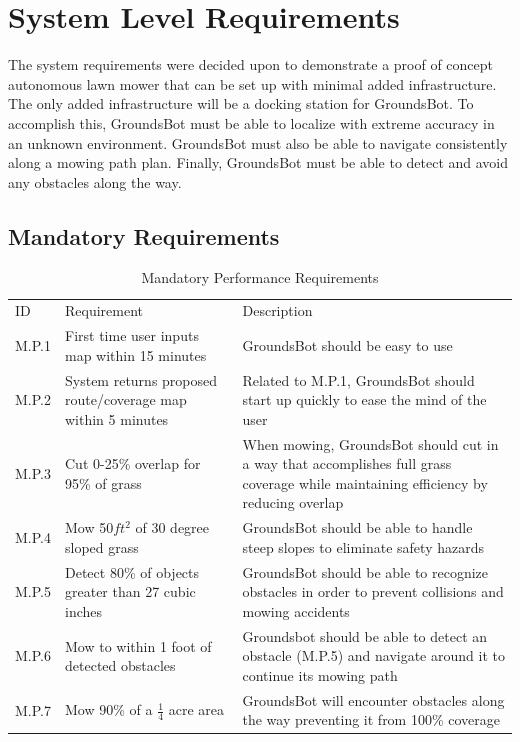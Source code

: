 \documentclass[12pt]{extarticle}
\begin{document}
\newpage
\section{System Level Requirements}

The system requirements were decided upon to demonstrate a proof of concept autonomous lawn mower that can be set up with minimal added infrastructure. The only added infrastructure will be a docking station for GroundsBot. To accomplish this, GroundsBot must be able to localize with extreme accuracy in an unknown environment. GroundsBot must also be able to navigate consistently along a mowing path plan. Finally, GroundsBot must be able to detect and avoid any obstacles along the way.

\subsection{Mandatory Requirements}
\begin{center}
  \begin{table}[H]
  \caption{Mandatory Performance Requirements}
  \label{table:mandatory performance}

  \def\arraystretch{1.5}
  	\begin{tabularx}{\textwidth}{ lXX }
  	  \hline

		\sffamily\normalsize{ID} & \sffamily\normalsize{Requirement} & \sffamily\normalsize{Description} \\
    	M.P.1 &
    	First time user inputs map within 15 minutes &
    	GroundsBot should be easy to use \\
   		M.P.2 &
   		System returns proposed route/coverage map within 5 minutes &
   		Related to M.P.1, GroundsBot should start up quickly to ease the mind of the user \\
   		M.P.3 &
   		Cut 0-25\% overlap for 95\% of grass &
   		When mowing, GroundsBot should cut in a way that accomplishes full grass coverage while maintaining efficiency by reducing overlap\\
		M.P.4 &
		Mow 50$ft^2$ of 30 degree sloped grass &
		GroundsBot should be able to handle steep slopes to eliminate safety hazards \\
		M.P.5 &
		Detect 80\% of objects greater than 27 cubic inches &
		GroundsBot should be able to recognize obstacles in order to prevent collisions and mowing accidents \\
		M.P.6 &
		Mow to within 1 foot of detected obstacles &
		Groundsbot should be able to detect an obstacle (M.P.5) and navigate around it to continue its mowing path \\
		M.P.7 &
		Mow 90\% of a $\frac{1}{4}$ acre area &
		GroundsBot will encounter obstacles along the way preventing it from 100\% coverage \\
	\end{tabularx}
  \end{table}
\end{center}
\end{document}
